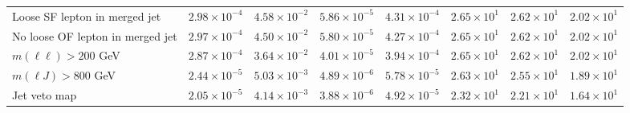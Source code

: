 \begin{table}[htp]
{\begin{tabular}{l | c c c c | c c c}
      Loose SF lepton in merged jet & $2.98 \times 10^{-4}$ & $4.58 \times 10^{-2}$ & $5.86 \times 10^{-5}$ & $4.31 \times 10^{-4}$ & $2.65 \times 10^{1}$ & $2.62 \times 10^{1}$ & $2.02 \times 10^{1}$ \\
      No loose OF lepton in merged jet & $2.97 \times 10^{-4}$ & $4.50 \times 10^{-2}$ & $5.80 \times 10^{-5}$ & $4.27 \times 10^{-4}$ & $2.65 \times 10^{1}$ & $2.62 \times 10^{1}$ & $2.02 \times 10^{1}$ \\
      $m(\ell\ell) > 200$ GeV & $2.87 \times 10^{-4}$ & $3.64 \times 10^{-2}$ & $4.01 \times 10^{-5}$ & $3.94 \times 10^{-4}$ & $2.65 \times 10^{1}$ & $2.62 \times 10^{1}$ & $2.02 \times 10^{1}$ \\
      $m(\ell J) > 800$ GeV & $2.44 \times 10^{-5}$ & $5.03 \times 10^{-3}$ & $4.89 \times 10^{-6}$ & $5.78 \times 10^{-5}$ & $2.63 \times 10^{1}$ & $2.55 \times 10^{1}$ & $1.89 \times 10^{1}$ \\
      Jet veto map & $2.05 \times 10^{-5}$ & $4.14 \times 10^{-3}$ & $3.88 \times 10^{-6}$ & $4.92 \times 10^{-5}$ & $2.32 \times 10^{1}$ & $2.21 \times 10^{1}$ & $1.64 \times 10^{1}$ \\
      \hline
    \end{tabular}
  }
\end{table}
